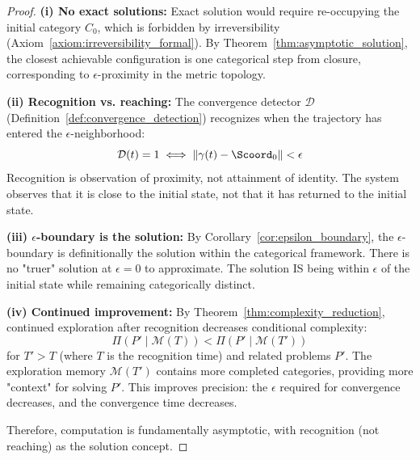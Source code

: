 \begin{proof}
\textbf{(i) No exact solutions:} Exact solution would require re-occupying the initial category $C_0$, which is forbidden by irreversibility (Axiom~\ref{axiom:irreversibility_formal}). By Theorem~\ref{thm:asymptotic_solution}, the closest achievable configuration is one categorical step from closure, corresponding to $\epsilon$-proximity in the metric topology.

\textbf{(ii) Recognition vs. reaching:} The convergence detector $\mathcal{D}$ (Definition~\ref{def:convergence_detection}) recognizes when the trajectory has entered the $\epsilon$-neighborhood:
\begin{equation}
\mathcal{D}(t) = 1 \iff \|\gamma(t) - \Scoord_0\| < \epsilon
\end{equation}
Recognition is observation of proximity, not attainment of identity. The system observes that it is close to the initial state, not that it has returned to the initial state.

\textbf{(iii) $\epsilon$-boundary is the solution:} By Corollary~\ref{cor:epsilon_boundary}, the $\epsilon$-boundary is definitionally the solution within the categorical framework. There is no "truer" solution at $\epsilon = 0$ to approximate. The solution IS being within $\epsilon$ of the initial state while remaining categorically distinct.

\textbf{(iv) Continued improvement:} By Theorem~\ref{thm:complexity_reduction}, continued exploration after recognition decreases conditional complexity:
\begin{equation}
\Pi(P' \mid \mathcal{M}(T)) < \Pi(P' \mid \mathcal{M}(T'))
\end{equation}
for $T' > T$ (where $T$ is the recognition time) and related problems $P'$. The exploration memory $\mathcal{M}(T')$ contains more completed categories, providing more "context" for solving $P'$. This improves precision: the $\epsilon$ required for convergence decreases, and the convergence time decreases.

Therefore, computation is fundamentally asymptotic, with recognition (not reaching) as the solution concept.
\end{proof}

